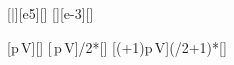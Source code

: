 [\bar][e5][\pascal]
[\liter][e-3][\m\cubed]

[p\,\Delta V]{\pNX*\dVX}[\joule]
[\,p\,\Delta V]{\fNX/2*\pNX*\dVX}[\joule]
[\left(+1\right)p\,\Delta V]{(\fNX/2+1)*\pNX*\dVX}[\joule]
